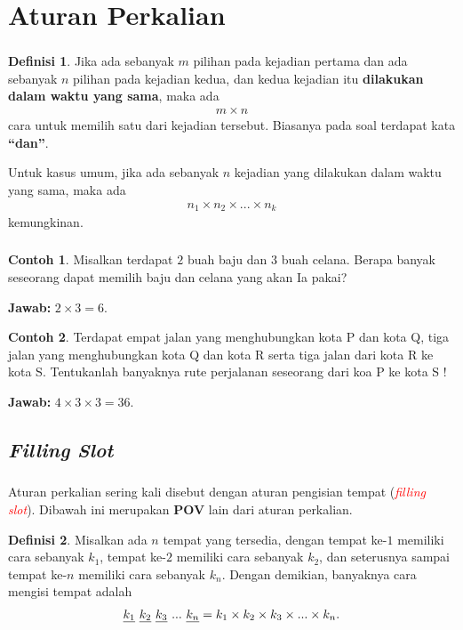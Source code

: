 \documentclass[aspectratio=169]{beamer}
\theoremstyle{definition}
\newtheorem{definisi}{Definisi}
\newtheorem{contoh}{Contoh}
\begin{document}
\section{Aturan Perkalian}
\begin{frame}
\frametitle{\insertsection}
\begin{definisi}
  Jika ada sebanyak $m$ pilihan pada kejadian pertama dan ada sebanyak $n$ pilihan pada kejadian kedua, dan kedua kejadian itu \textbf{dilakukan dalam waktu yang sama}, maka ada
  \begin{align}
      m \times n
  \end{align}
  cara untuk memilih satu dari kejadian tersebut. Biasanya pada soal terdapat kata \textbf{``dan''}.
\end{definisi}
Untuk kasus umum, jika ada sebanyak $n$ kejadian yang dilakukan dalam waktu yang sama, maka ada
\begin{align}
    n_1 \times n_2 \times ... \times n_k
\end{align}
kemungkinan.
\end{frame}

\begin{frame}
  \frametitle{\insertsection}
  \begin{contoh}
    Misalkan terdapat $2$ buah baju dan $3$ buah celana. Berapa banyak seseorang dapat memilih baju dan celana yang akan Ia pakai?
  \end{contoh}
  \textbf{Jawab:} $2\times 3=6$.
  \begin{contoh}
    Terdapat empat jalan yang menghubungkan kota P dan kota Q, tiga jalan yang menghubungkan kota Q dan kota R serta tiga jalan dari kota R ke kota S. Tentukanlah banyaknya rute perjalanan seseorang dari koa P ke kota S !
  \end{contoh}
  \textbf{Jawab:} $4\times 3\times 3= 36$.
\end{frame}

\subsection{\textit{Filling Slot}}
\begin{frame}
\frametitle{\insertsection}
\framesubtitle{\insertsubsection}
Aturan perkalian sering kali disebut dengan aturan pengisian tempat (\textit{\textcolor{red}{filling slot}}). Dibawah ini merupakan \textbf{POV} lain dari aturan perkalian.
\begin{definisi}
  Misalkan ada $n$ tempat yang tersedia, dengan tempat ke-$1$ memiliki cara sebanyak $k_1$, tempat ke-$2$ memiliki cara sebanyak $k_2$, dan seterusnya sampai tempat ke-$n$ memiliki cara sebanyak $k_n$. Dengan demikian, banyaknya cara mengisi tempat adalah 
  \begin{align}
      \uline{k_1} \ \uline{k_2} \ \uline{k_3} \ ... \ \uline{k_n} = k_1 \times k_2 \times k_3 \times ... \times k_n.
  \end{align}
\end{definisi}

\end{frame}
\end{document}
